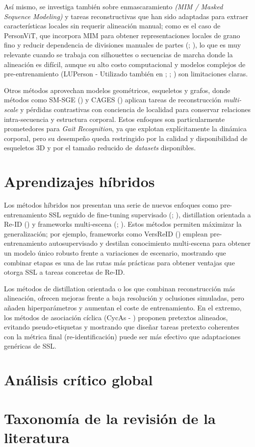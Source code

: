 Así mismo, se investiga también sobre enmascaramiento \textit{(MIM / Masked Sequence Modeling)} y tareas reconstructivas que han sido adaptadas para extraer características locales sin requerir alineación manual; como es el caso de PersonViT, que incorpora MIM para obtener representaciones locales de grano fino y reducir dependencia de divisiones manuales de partes (\cite{Han2021LocalitySGE}; \cite{Wang2025GaitForeMer}), lo que es muy relevante cuando se trabaja con silhouettes o secuencias de marcha donde la alineación es difícil, aunque su alto costo computacional y modelos complejos de pre-entrenamiento (LUPerson - Utilizado también en \cite{Zheng2022PASS}; \cite{Li2025OrientedKD}; \cite{Xu2023VILLS}) son limitaciones claras.

Otros métodos aprovechan modelos geométricos, esqueletos y grafos, donde métodos como SM-SGE (\cite{Han2021SMSGE}) y CAGES (\cite{Han2021LocalitySGE}) aplican tareas de reconstrucción \textit{multi-scale} y pérdidas contrastivas con conciencia de localidad para conservar relaciones intra-secuencia y estructura corporal. Estos enfoques son particularmente prometedores para \textit{Gait Recognition}, ya que explotan explícitamente la dinámica corporal, pero su desempeño queda restringido por la calidad y disponibilidad de esqueletos 3D y por el tamaño reducido de \textit{datasets} disponibles.

\section{Aprendizajes híbridos}

Los métodos híbridos nos presentan una serie de nuevos enfoques como pre-entrenamiento SSL seguido de fine-tuning supervisado (\cite{Dou2023IdentitySeeking}; \cite{Huang2025PersonViT}), distillation orientada a Re-ID (\cite{Li2025OrientedKD}) y frameworks multi-escena (\cite{Liu2025UCMVeID}; \cite{Rao2024MSFFT}). Estos métodos permiten máximizar la generalización; por ejemplo, frameworks como VersReID (\cite{Zhou2024VersReID}) emplean pre-entrenamiento autosupervisado y destilan conocimiento multi-escena para obtener un modelo único robusto frente a variaciones de escenario, mostrando que combinar etapas es una de las rutas más prácticas para obtener ventajas que otorga SSL a tareas concretas de Re-ID.

Los métodos de distillation orientada o los que combinan reconstrucción más alineación, ofrecen mejoras frente a baja resolución y oclusiones simuladas, pero añaden hiperparámetros y aumentan el coste de entrenamiento. En el extremo, los métodos de asociación cíclica (CycAs - \cite{Gao2025CycAs}) proponen pretextos alineados, evitando pseudo-etiquetas y mostrando que diseñar tareas pretexto coherentes con la métrica final (re-identificación) puede ser más efectivo que adaptaciones genéricas de SSL.

\section{Análisis crítico global}

\section{Taxonomía de la revisión de la literatura}